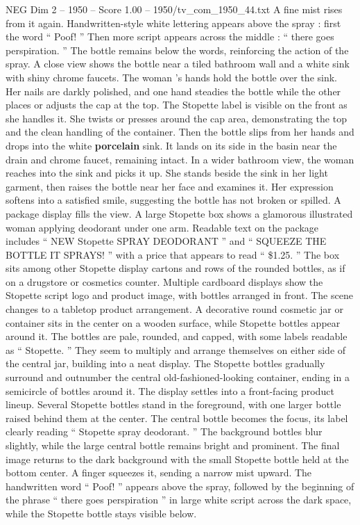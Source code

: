 \begin{textsample}{NEG Dim 2 – 1950 – Score 1.00 – 1950/tv\_com\_1950\_44.txt}
A fine mist rises from it again.
Handwritten-style white lettering appears above the spray : first the word “ Poof! ” Then more script appears across the middle : “ there goes perspiration. ” The bottle remains below the words, reinforcing the action of the spray.
A close view shows the bottle near a tiled bathroom wall and a white sink with shiny chrome faucets.
The woman ’s hands hold the bottle over the sink.
Her nails are darkly polished, and one hand steadies the bottle while the other places or adjusts the cap at the top.
The Stopette label is visible on the front as she handles it.
She twists or presses around the cap area, demonstrating the top and the clean handling of the container.
Then the bottle slips from her hands and drops into the white \textbf{porcelain} sink.
It lands on its side in the basin near the drain and chrome faucet, remaining intact.
In a wider bathroom view, the woman reaches into the sink and picks it up.
She stands beside the sink in her light garment, then raises the bottle near her face and examines it.
Her expression softens into a satisfied smile, suggesting the bottle has not broken or spilled.
A package display fills the view.
A large Stopette box shows a glamorous illustrated woman applying deodorant under one arm.
Readable text on the package includes “ NEW Stopette SPRAY DEODORANT ” and “ SQUEEZE THE BOTTLE IT SPRAYS! ” with a price that appears to read “ \$1.25. ” The box sits among other Stopette display cartons and rows of the rounded bottles, as if on a drugstore or cosmetics counter.
Multiple cardboard displays show the Stopette script logo and product image, with bottles arranged in front.
The scene changes to a tabletop product arrangement.
A decorative round cosmetic jar or container sits in the center on a wooden surface, while Stopette bottles appear around it.
The bottles are pale, rounded, and capped, with some labels readable as “ Stopette. ” They seem to multiply and arrange themselves on either side of the central jar, building into a neat display.
The Stopette bottles gradually surround and outnumber the central old-fashioned-looking container, ending in a semicircle of bottles around it.
The display settles into a front-facing product lineup.
Several Stopette bottles stand in the foreground, with one larger bottle raised behind them at the center.
The central bottle becomes the focus, its label clearly reading “ Stopette spray deodorant. ” The background bottles blur slightly, while the large central bottle remains bright and prominent.
The final image returns to the dark background with the small Stopette bottle held at the bottom center.
A finger squeezes it, sending a narrow mist upward.
The handwritten word “ Poof! ” appears above the spray, followed by the beginning of the phrase “ there goes perspiration ” in large white script across the dark space, while the Stopette bottle stays visible below.

\end{textsample}
